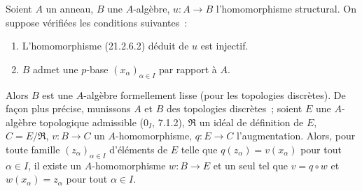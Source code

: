 \begin{theorem}[21.2.7]
\label{0.21.2.7-fr}
Soient $A$ un anneau, $B$ une $A$-algèbre, $u:A\to B$ l'homomorphisme
structural. On suppose vérifiées les conditions suivantes~:
\begin{enumerate}
  \item[(i)] L'homomorphisme (21.2.6.2) déduit de $u$ est injectif.
  \item[(ii)] $B$ admet une $p$-base $(x_\alpha)_{\alpha\in I}$ par rapport à $A$.
\end{enumerate}
Alors $B$ est une $A$-algèbre formellement lisse (pour les topologies
discrètes). De façon plus précise, munissons $A$ et $B$ des topologies
discrètes~; soient $E$ une $A$-algèbre topologique admissible
(0$_I$, 7.1.2), $\mathfrak R$ un idéal de définition de $E$, $C=E/\mathfrak R$,
$v:B\to C$ un $A$-homomorphisme, $q:E\to C$ l'augmentation. Alors, pour
toute famille $(z_\alpha)_{\alpha\in I}$ d'éléments de $E$ telle que
$q(z_\alpha)=v(x_\alpha)$ pour tout $\alpha\in I$, il existe un
$A$-homomorphisme $w:B\to E$ et un seul tel que $v=q\circ w$ et
$w(x_\alpha)=z_\alpha$ pour tout $\alpha\in I$.
\end{theorem}

